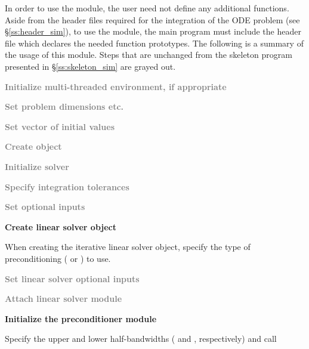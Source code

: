 In order to use the {\cvbandpre} module, the user need not define any
additional functions.
Aside from the header files required for the integration of the ODE problem
(see \S\ref{ss:header_sim}),  to use the {\cvbandpre} module, the main program
must include the header file  which declares the needed
function prototypes.
The following is a summary of the usage of this module. Steps that are
unchanged from the skeleton program presented in
\S\ref{ss:skeleton_sim} are grayed out.
\begin{Steps}

\item
  \textcolor{gray}{\bf Initialize multi-threaded environment, if appropriate}

\item
  \textcolor{gray}{\bf Set problem dimensions etc.}

\item
  \textcolor{gray}{\bf Set vector of initial values}

\item
  \textcolor{gray}{\bf Create {\cvode} object}

\item
  \textcolor{gray}{\bf Initialize {\cvode} solver}

\item
  \textcolor{gray}{\bf Specify integration tolerances}

\item
  \textcolor{gray}{\bf Set optional inputs}

\item
  {\bf Create linear solver object}

  When creating the iterative linear solver object, specify the type
  of preconditioning ( or ) to use.

\item
  \textcolor{gray}{\bf Set linear solver optional inputs}

\item \label{i:bandpre_attach}
  \textcolor{gray}{\bf Attach linear solver module}

\item \label{i:bandpre_init}
  {\bf Initialize the {\cvbandpre} preconditioner module}

  Specify the upper and lower half-bandwidths ( and , respectively) and call


\end{Steps}
